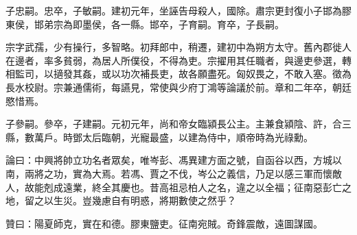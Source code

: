 \begin{pinyinscope}
子忠嗣。忠卒，子敏嗣。建初元年，坐誣告母殺人，國除。肅宗更封復小子邯為膠東侯，邯弟宗為即墨侯，各一縣。邯卒，子育嗣。育卒，子長嗣。

宗字武孺，少有操行，多智略。初拜郎中，稍遷，建初中為朔方太守。舊內郡徙人在邊者，率多貧弱，為居人所僕役，不得為吏。宗擢用其任職者，與邊吏參選，轉相監司，以擿發其姦，或以功次補長吏，故各願盡死。匈奴畏之，不敢入塞。徵為長水校尉。宗兼通儒術，每讌見，常使與少府丁鴻等論議於前。章和二年卒，朝廷愍惜焉。

子參嗣。參卒，子建嗣。元初元年，尚和帝女臨潁長公主。主兼食潁陰、許，合三縣，數萬戶。時鄧太后臨朝，光寵最盛，以建為侍中，順帝時為光祿勳。

論曰：中興將帥立功名者眾矣，唯岑彭、馮異建方面之號，自函谷以西，方城以南，兩將之功，實為大焉。若馮、賈之不伐，岑公之義信，乃足以感三軍而懷敵人，故能剋成遠業，終全其慶也。昔高祖忌柏人之名，違之以全福；征南惡彭亡之地，留之以生災。豈幾慮自有明惑，將期數使之然乎？

贊曰：陽夏師克，實在和德。膠東鹽吏。征南宛賊。奇鋒震敵，遠圖謀國。


\end{pinyinscope}